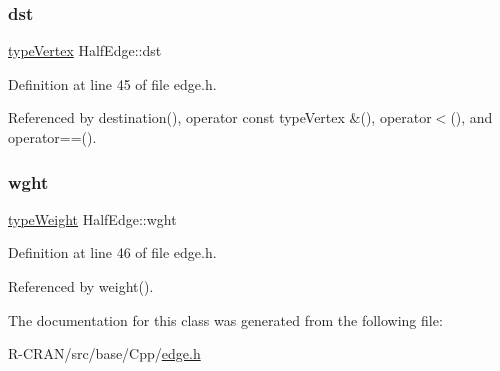 \subsubsection{\texorpdfstring{dst}{dst}}
{\footnotesize\ttfamily \hyperlink{edge_8h_a5fbd20c46956d479cb10afc9855223f6}{type\+Vertex} Half\+Edge\+::dst\hspace{0.3cm}{\ttfamily [private]}}



Definition at line 45 of file edge.\+h.



Referenced by destination(), operator const type\+Vertex \&(), operator$<$(), and operator==().

\mbox{\label{classHalfEdge_a936c45336ec030a89e06966d1344ac36}} 
\subsubsection{\texorpdfstring{wght}{wght}}
{\footnotesize\ttfamily \hyperlink{edge_8h_a2e7ea3be891ac8b52f749ec73fee6dd2}{type\+Weight} Half\+Edge\+::wght\hspace{0.3cm}{\ttfamily [private]}}



Definition at line 46 of file edge.\+h.



Referenced by weight().



The documentation for this class was generated from the following file\+:\begin{DoxyCompactItemize}
\item 
R-\/\+C\+R\+A\+N/src/base/\+Cpp/\hyperlink{edge_8h}{edge.\+h}\end{DoxyCompactItemize}
